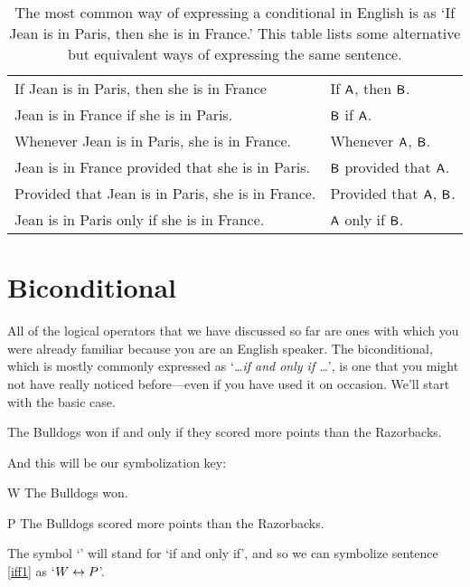 \begin{table*}\centering\sffamily\footnotesize
{}
\begin{tabular}{@{}l l@{}}\toprule
If Jean is in Paris, then she is in France & If $\mathsf{A}$, then $\mathsf{B}$.\\
Jean is in France if she is in Paris. 	&	$\mathsf{B}$ if $\mathsf{A}$.\\
Whenever Jean is in Paris, she is in France.  	&	Whenever $\mathsf{A}$, $\mathsf{B}$.\\
Jean is in France provided that she is in Paris. 	&	$\mathsf{B}$ provided that $\mathsf{A}$.\\
Provided that Jean is in Paris, she is in France. 	&	Provided that $\mathsf{A}$, $\mathsf{B}$.\\
Jean is in Paris only if she is in France. 	&	$\mathsf{A}$ only if $\mathsf{B}$.\\
\bottomrule
\end{tabular}
\caption{The most common way of expressing a conditional in English is as `If Jean is in Paris, then she is in France.' This table lists some alternative but equivalent ways of expressing the same sentence.}\label{table.conditional.English}
\end{table*}


\section{Biconditional}\label{s:biconditional-1}

All of the logical operators that we have discussed so far are ones with which you were already familiar because you are an English speaker. The biconditional, which is mostly commonly expressed as `\textit{\ldots if and only if \ldots}', is one that you might not have really noticed before---even if you have used it on occasion. We'll start with the basic case.
	\begin{earg}
		\item[\ex{iff1}] The Bulldogs won if and only if they scored more points than the Razorbacks.
	\end{earg}
And this will be our symbolization key:
	\begin{ekey}
		\item[W] The Bulldogs won.
		\item[P] The Bulldogs scored more points than the Razorbacks.
	\end{ekey}
The symbol `\eiff' will stand for `if and only if', and so we can symbolize sentence \ref{iff1} as `$W \leftrightarrow P$'.

